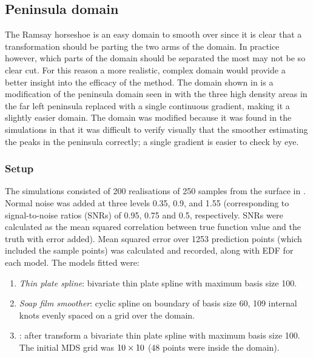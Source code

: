 \subsection{Peninsula domain}
\label{mds-wt2-sim}

The Ramsay horseshoe is an easy domain to smooth over since it is clear that a transformation should be parting the two arms of the domain. In practice however, which parts of the domain should be separated the most may not be so clear cut. For this reason a more realistic, complex domain would provide a better insight into the efficacy of the method. The domain shown in  is a modification of the peninsula domain seen in  with the three high density areas in the far left peninsula replaced with a single continuous gradient, making it a slightly easier domain. The domain was modified because it was found in the simulations in \secref{} that it was difficult to verify visually that the smoother estimating the peaks in the peninsula correctly; a single gradient is easier to check by eye.

\subsubsection{Setup}

The simulations consisted of 200 realisations of 250 samples from the surface in . Normal noise was added at three levels  0.35, 0.9, and 1.55 (corresponding to signal-to-noise ratios (SNRs) of 0.95, 0.75 and 0.5, respectively. SNRs were calculated as the mean squared correlation between true function value and the truth with error added). Mean squared error over 1253 prediction points (which included the sample points) was calculated and recorded, along with EDF for each model. The models fitted were:
\begin{enumerate}
\item \emph{Thin plate spline}: bivariate thin plate spline with maximum basis size 100. 
\item \emph{Soap film smoother}: cyclic spline on boundary of basis size 60, 109 internal knots evenly spaced on a grid over the domain.
\item \emph{\mdsap}: after transform a bivariate thin plate spline with maximum basis size 100. The initial MDS grid was $10 \times 10$ (48 points were inside the domain).
\end{enumerate} 


